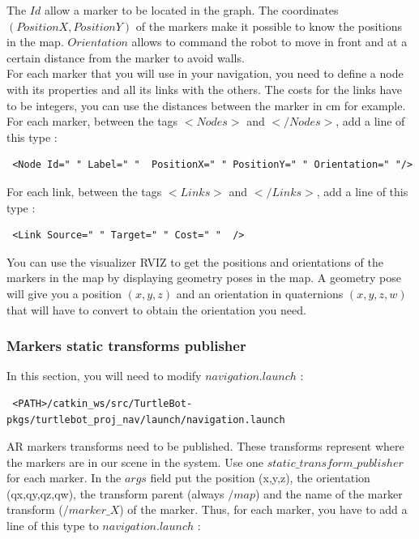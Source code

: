 \documentclass[10pt,a4paper]{article}
\begin{document}
The $Id$ allow a marker to be located in the graph. The coordinates $(PositionX,PositionY)$ of the markers make it possible to know the positions in the map. $Orientation$ allows to command the robot to move in front and at a certain distance from the marker to avoid walls.\\

For each marker that you will use in your navigation, you need to define a node with its properties and all its links with the others. The costs for the links have to be integers, you can use the distances between the marker in cm for example. \\

For each marker, between the tags $<Nodes>$ and $</Nodes>$, add a line of this type : 

\begin{verbatim} <Node Id=" " Label=" "  PositionX=" " PositionY=" " Orientation=" "/> \end{verbatim}

For each link, between the tags $<Links>$ and $</Links>$, add a line of this type : 

\begin{verbatim} <Link Source=" " Target=" " Cost=" "  /> \end{verbatim}

You can use the visualizer RVIZ to get the positions and orientations of the markers in the map by displaying geometry poses in the map. A geometry pose will give you a position $(x,y,z)$ and an orientation in quaternions $(x,y,z,w)$ that will have to convert to obtain the orientation you need.

\subsubsection{Markers static transforms publisher}
\label{sec:markersStaticTransformsPublisher}

In this section, you will need to modify $navigation.launch$ :

\begin{verbatim} <PATH>/catkin_ws/src/TurtleBot-pkgs/turtlebot_proj_nav/launch/navigation.launch\end{verbatim}

AR markers transforms need to be published. These transforms represent where the markers are in our scene in the system. Use one $static\_transform\_publisher$ for each marker. In the $args$ field put the position (x,y,z), the orientation (qx,qy,qz,qw), the transform parent (always $/map$) and the name of the marker transform ($/marker\_X$) of the marker. Thus, for each marker, you have to add a line of this type to $navigation.launch$ :
\end{document}
